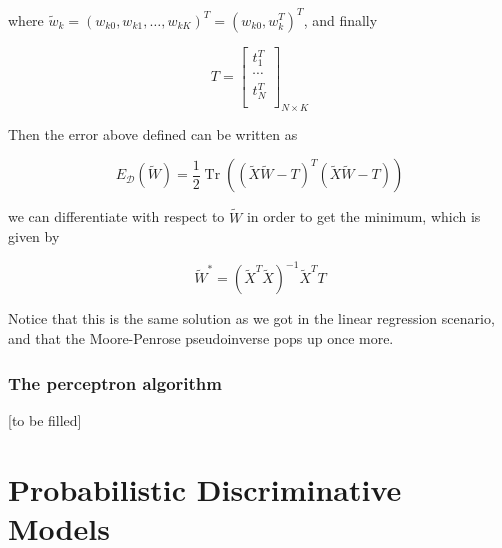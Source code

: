 \documentclass{report}
\DeclareMathOperator{\Tr}{Tr}
\begin{document}
where $\widetilde{w}_k = (w_{k0}, w_{k1}, \dots, w_{kK})^T = (w_{k0}, w_k^T)^T$, and finally

\[T = \begin{bmatrix}
	t_1^T\\
	\cdots\\
	t_N^T\\
\end{bmatrix}_{N\times K} \]

Then the error above defined can be written as

\[E_\mathcal{D}\left(\widetilde{W}\right) = \frac{1}{2}\Tr\left((\widetilde{X}\widetilde{W} - T)^T(\widetilde{X}\widetilde{W} - T)\right)\]

we can differentiate with respect to $\widetilde{W}$ in order to get the minimum, which is given by

\[\widetilde{W}^* = (\widetilde{X}^T\widetilde{X})^{-1}\widetilde{X}^TT\]

Notice that this is the same solution as we got in the linear regression scenario, and that the Moore-Penrose pseudoinverse pops up once more.

\subsubsection{The perceptron algorithm}

[to be filled]

\section{Probabilistic Discriminative Models}
\end{document}

